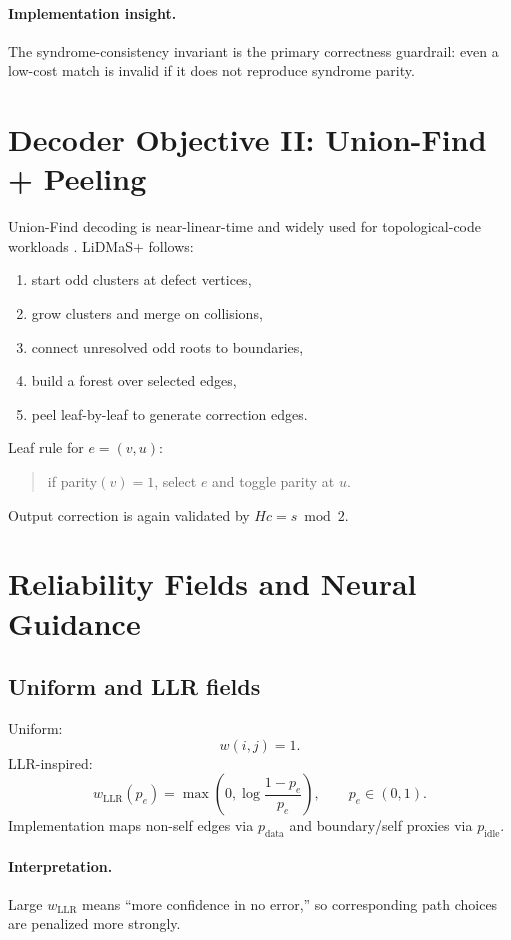\documentclass[11pt]{article}
\begin{document}
\paragraph{Implementation insight.}
The syndrome-consistency invariant is the primary correctness guardrail: even a low-cost match is invalid if it does not reproduce syndrome parity.

\section{Decoder Objective II: Union-Find + Peeling}
Union-Find decoding is near-linear-time and widely used for topological-code workloads \cite{unionfind2017}. LiDMaS+ follows:
\begin{enumerate}[label=\arabic*.]
  \item start odd clusters at defect vertices,
  \item grow clusters and merge on collisions,
  \item connect unresolved odd roots to boundaries,
  \item build a forest over selected edges,
  \item peel leaf-by-leaf to generate correction edges.
\end{enumerate}

Leaf rule for $e=(v,u)$:
\begin{quote}
if parity$(v)=1$, select $e$ and toggle parity at $u$.
\end{quote}
Output correction is again validated by $Hc=s\bmod 2$.

\section{Reliability Fields and Neural Guidance}
\subsection{Uniform and LLR fields}
Uniform:
\begin{equation}
w(i,j)=1.
\end{equation}
LLR-inspired:
\begin{equation}
w_{\mathrm{LLR}}(p_e)=\max\!\left(0,\log\frac{1-p_e}{p_e}\right),\qquad p_e\in(0,1).
\end{equation}
Implementation maps non-self edges via $p_{\mathrm{data}}$ and boundary/self proxies via $p_{\mathrm{idle}}$.

\paragraph{Interpretation.}
Large $w_{\mathrm{LLR}}$ means ``more confidence in no error,'' so corresponding path choices are penalized more strongly.
\end{document}
